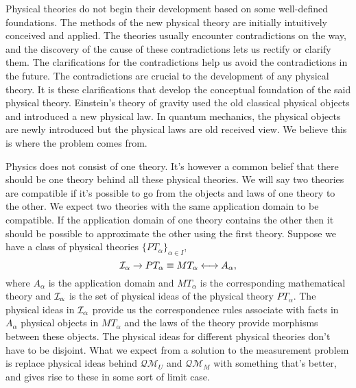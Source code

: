\documentclass[11pt]{report}
\begin{document}
Physical theories do not begin their development based on some well-defined foundations. The methods of the new physical theory are initially intuitively conceived and applied. The theories usually encounter contradictions on the way, and the discovery of the cause of these contradictions lets us rectify or clarify them. The clarifications for the contradictions help us avoid the contradictions in the future. The contradictions are crucial to the development of any physical theory. It is these clarifications that develop the conceptual foundation of the said physical theory. Einstein's theory of gravity used the old classical physical objects and introduced a new physical law. In quantum mechanics, the physical objects are newly introduced but the physical laws are old received view. We believe this is where the problem comes from. 

Physics does not consist of one theory. It's however a common belief that there should be one theory behind all these physical theories. We will say two theories are compatible if it's possible to go from the objects and laws of one theory to the other. We expect two theories with the same application domain to be compatible. If the application domain of one theory contains the other then it should be possible to approximate the other using the first theory. Suppose we have a class of physical theories $\{PT_\alpha\}_{\alpha\in I}$,
$$\mathcal{I}_\alpha\to PT_\alpha\equiv MT_\alpha \longleftrightarrow A_\alpha,$$
where $A_\alpha$ is the application domain and $MT_\alpha$ is the corresponding mathematical theory and $\mathcal{I}_\alpha$ is the set of physical ideas of the physical theory $PT_\alpha$. The physical ideas in $\mathcal{I}_\alpha$ provide us the correspondence rules associate with facts in $A_\alpha$ physical objects in $MT_\alpha$ and the laws of the theory provide morphisms between these objects. The physical ideas for different physical theories don't have to be disjoint. What we expect from a solution to the measurement problem is replace physical ideas behind $\mathcal{QM}_U$ and $\mathcal{QM}_M$ with something that's better, and gives rise to these in some sort of limit case.





\clearpage

\vspace{-3em}
\vspace{-3em}

\end{document}
